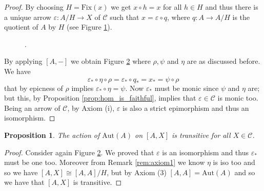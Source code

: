 \documentclass[italian, 12pt, reqno]{article}
\theoremstyle{myteo}
\newtheorem{proposition}[theorem]{Proposition}
\numberwithin{equation}{section}
\newcommand{\cat}[1]{\mathscr{#1}}
\newcommand{\fix}[1]{\text{Fix}(#1)}
\newcommand{\homs}[2]{[#1, #2]}
\newcommand{\fun}[3]{#1\colon#2\to #3}
\begin{document}
\begin{proof}
	By choosing \(H = \fix{x}\) we get \(x\circ h = x\) for all \(h\in H\) and thus there is a unique arrow \(\fun{\varepsilon}{A/H}{X}\) of \(\cat{C}\) such that \(x = \varepsilon\circ q\), where \(\fun{q}{A}{A/H}\) is the quotient of \(A\) by \(H\) (see Figure \ref{diagram:varepsilon}).
  \begin{figure}
    \begin{center}
      .
    \end{center}
    \caption{}
    \label{diagram:varepsilon}
  \end{figure}
	\begin{figure}
    \begin{center}
    \end{center}
    \caption{}
    \label{diagram:big_diagram}
  \end{figure}

	By applying \(\homs{A}{-}\) we obtain Figure \ref{diagram:big_diagram} where \(\rho, \psi\) and \(\eta\) are as discussed before.
  We have
  \[\varepsilon_*\circ \eta\circ\rho = \varepsilon_*\circ q_* = x_* = \psi\circ \rho\]
  that by epicness of \(\rho\) implies \(\varepsilon_*\circ \eta = \psi\).
  Now \(\varepsilon_*\) must be monic since \(\psi\) and \(\eta\) are; but this, by Proposition \ref{prop:hom_is_faithful}, implies that \(\varepsilon\in\cat{C}\) is monic too.
  Being an arrow of \(\cat{C}\), by Axiom (i), \(\varepsilon\) is also a strict epimorphism and thus an isomorphism.
\end{proof}

\begin{proposition}
  \label{prop:transitive_action}
  The action of \(\text{Aut}(A)\) on \(\homs{A}{X}\) is transitive for all \(X\in\cat{C}\).
\end{proposition}

\begin{proof}
  Consider again Figure \ref{diagram:big_diagram}.
  We proved that \(\varepsilon\) is an isomorphism and thus \(\varepsilon_*\) must be one too.
  Moreover from Remark \ref{rem:axiom1} we know \(\eta\) is iso too and so we have \(\homs{A}{X}\cong \homs{A}{A}/H\), but by Axiom (3) \(\homs{A}{A} = \text{Aut}(A)\) and so we have that \(\homs{A}{X}\) is transitive.
\end{proof}
\end{document}
